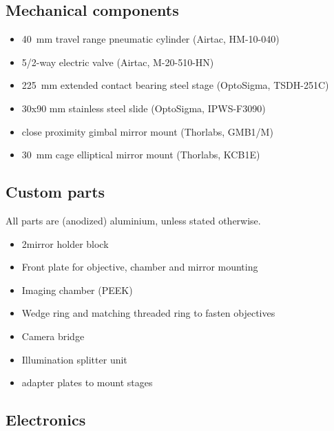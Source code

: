 \begin{singlespace}
\subsection*{Mechanical components}
  \begin{itemize}
    \item \SI{40}{mm} travel range pneumatic cylinder (Airtac, HM-10-040)
    \item 5/2-way electric valve (Airtac, M-20-510-HN)
    \item 2\texttimes \SI{25}{mm} extended contact bearing steel stage (OptoSigma, TSDH-251C)
    \item 30x90 mm stainless steel slide (OptoSigma,  IPWS-F3090)
    \item close proximity gimbal mirror mount (Thorlabs, GMB1/M)
    \item \SI{30}{mm} cage elliptical mirror mount (Thorlabs, KCB1E)
  \end{itemize}

\subsection*{Custom parts}
  All parts are (anodized) aluminium, unless stated otherwise.
  \begin{itemize}
    \item 2\texttimes mirror holder block
    \item Front plate for objective, chamber and mirror mounting
    \item Imaging chamber (PEEK)
    \item Wedge ring and matching threaded ring to fasten objectives
    \item Camera bridge
    \item Illumination splitter unit
    \item adapter plates to mount stages
  \end{itemize}

\subsection*{Electronics}


\end{singlespace}
